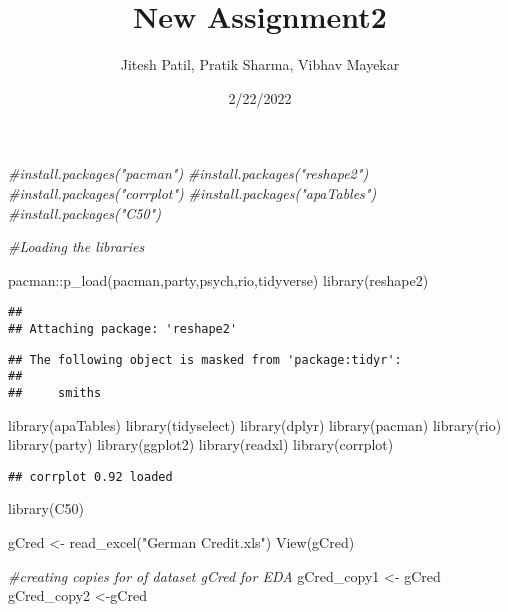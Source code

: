 \documentclass[
]{article}
\title{New Assignment2}
\author{Jitesh Patil, Pratik Sharma, Vibhav Mayekar}
\date{2/22/2022}
\newenvironment{Shaded}{\begin{snugshade}}{\end{snugshade}}
\newcommand{\CommentTok}[1]{\textcolor[rgb]{0.56,0.35,0.01}{\textit{#1}}}
\newcommand{\FunctionTok}[1]{\textcolor[rgb]{0.00,0.00,0.00}{#1}}
\newcommand{\NormalTok}[1]{#1}
\newcommand{\OtherTok}[1]{\textcolor[rgb]{0.56,0.35,0.01}{#1}}
\newcommand{\SpecialCharTok}[1]{\textcolor[rgb]{0.00,0.00,0.00}{#1}}
\newcommand{\StringTok}[1]{\textcolor[rgb]{0.31,0.60,0.02}{#1}}
\begin{document}
\maketitle

\begin{Shaded}
\begin{Highlighting}[]
\CommentTok{\#install.packages("pacman")}
\CommentTok{\#install.packages("reshape2")}
\CommentTok{\#install.packages("corrplot")}
\CommentTok{\#install.packages("apaTables")}
\CommentTok{\#install.packages("C50")}

\CommentTok{\#Loading the libraries }

\NormalTok{pacman}\SpecialCharTok{::}\FunctionTok{p\_load}\NormalTok{(pacman,party,psych,rio,tidyverse)}
\FunctionTok{library}\NormalTok{(reshape2)}
\end{Highlighting}
\end{Shaded}

\begin{verbatim}
## 
## Attaching package: 'reshape2'
\end{verbatim}

\begin{verbatim}
## The following object is masked from 'package:tidyr':
## 
##     smiths
\end{verbatim}

\begin{Shaded}
\begin{Highlighting}[]
\FunctionTok{library}\NormalTok{(apaTables)}
\FunctionTok{library}\NormalTok{(tidyselect)}
\FunctionTok{library}\NormalTok{(dplyr)}
\FunctionTok{library}\NormalTok{(pacman)}
\FunctionTok{library}\NormalTok{(rio)}
\FunctionTok{library}\NormalTok{(party)}
\FunctionTok{library}\NormalTok{(ggplot2)}
\FunctionTok{library}\NormalTok{(readxl)}
\FunctionTok{library}\NormalTok{(corrplot)}
\end{Highlighting}
\end{Shaded}

\begin{verbatim}
## corrplot 0.92 loaded
\end{verbatim}

\begin{Shaded}
\begin{Highlighting}[]
\FunctionTok{library}\NormalTok{(C50)}
\end{Highlighting}
\end{Shaded}

\begin{Shaded}
\begin{Highlighting}[]
\NormalTok{gCred }\OtherTok{\textless{}{-}} \FunctionTok{read\_excel}\NormalTok{(}\StringTok{"German Credit.xls"}\NormalTok{)}
\FunctionTok{View}\NormalTok{(gCred)}

\CommentTok{\#creating copies for of dataset gCred for EDA }
\NormalTok{gCred\_copy1 }\OtherTok{\textless{}{-}}\NormalTok{ gCred}
\NormalTok{gCred\_copy2 }\OtherTok{\textless{}{-}}\NormalTok{gCred }
\end{Highlighting}
\end{Shaded}
\end{document}

